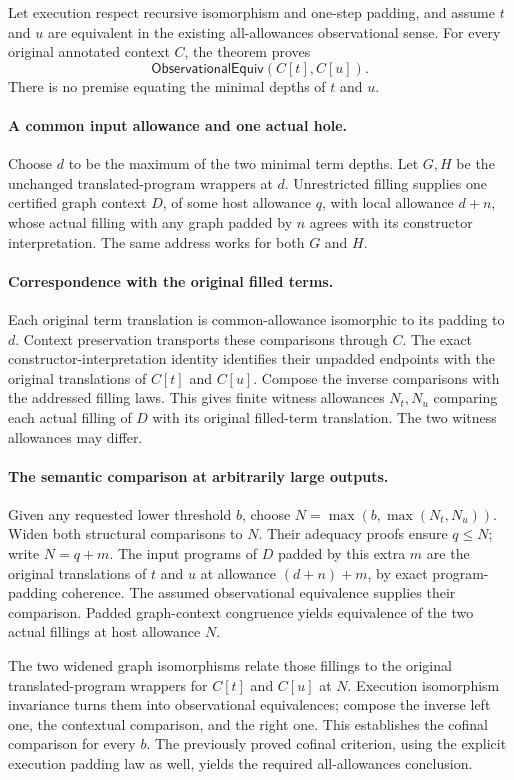 Let execution respect recursive isomorphism and one-step padding, and assume
$t$ and $u$ are equivalent in the existing all-allowances observational sense.
For every original annotated context $C$, the theorem proves
\[
 \mathsf{ObservationalEquiv}(C[t],C[u]).
\]
There is no premise equating the minimal depths of $t$ and $u$.

\paragraph{A common input allowance and one actual hole.}
Choose $d$ to be the maximum of the two minimal term depths. Let $G,H$ be the
unchanged translated-program wrappers at $d$. Unrestricted filling supplies
one certified graph context $D$, of some host allowance $q$, with local
allowance $d+n$, whose actual filling with any graph padded by $n$ agrees
with its constructor interpretation. The same address works for both $G$
and $H$.

\paragraph{Correspondence with the original filled terms.}
Each original term translation is common-allowance isomorphic to its padding
to $d$. Context preservation transports these comparisons through $C$.
The exact constructor-interpretation identity identifies their unpadded
endpoints with the original translations of $C[t]$ and $C[u]$. Compose the
inverse comparisons with the addressed filling laws. This gives finite
witness allowances $N_t,N_u$ comparing each actual filling of $D$ with its
original filled-term translation. The two witness allowances may differ.

\paragraph{The semantic comparison at arbitrarily large outputs.}
Given any requested lower threshold $b$, choose
$N=\max(b,\max(N_t,N_u))$. Widen both structural comparisons to $N$. Their
adequacy proofs ensure $q\leq N$; write $N=q+m$.
The input programs of $D$ padded by this extra $m$ are the original
translations of $t$ and $u$ at allowance $(d+n)+m$, by exact program-padding
coherence. The assumed observational equivalence supplies their comparison.
Padded graph-context congruence yields equivalence of the two actual fillings
at host allowance $N$.

The two widened graph isomorphisms relate those fillings to the original
translated-program wrappers for $C[t]$ and $C[u]$ at $N$. Execution isomorphism
invariance turns them into observational equivalences; compose the inverse
left one, the contextual comparison, and the right one. This establishes
the cofinal comparison for every $b$. The previously proved cofinal criterion,
using the explicit execution padding law as well, yields the required
all-allowances conclusion.

